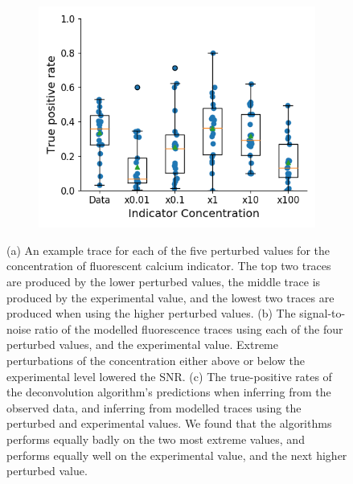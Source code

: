 \begin{figure}[p]
\begin{subfigure}{0.45\textwidth}
        \includegraphics[width=\linewidth]{figures/calcium_chapter/indictor_perturbed_oasis_first_paper.png}
        \caption{}
        \label{fig:indicator_perturbed_inference}
    \end{subfigure}
    \caption{(a) An example trace for each of the five perturbed values for the concentration of fluorescent calcium indicator. The top two traces are produced by the lower perturbed values, the middle trace is produced by the experimental value, and the lowest two traces are produced when using the higher perturbed values. (b) The signal-to-noise ratio of the modelled fluorescence traces using each of the four perturbed values, and the experimental value. Extreme perturbations of the concentration either above or below the experimental level lowered the SNR. (c) The true-positive rates of the deconvolution algorithm's predictions when inferring from the observed data, and inferring from modelled traces using the perturbed and experimental values. We found that the algorithms performs equally badly on the two most extreme values, and performs equally well on the experimental value, and the next higher perturbed value.}
    \label{fig:indicator_perturbed}
\end{figure}

